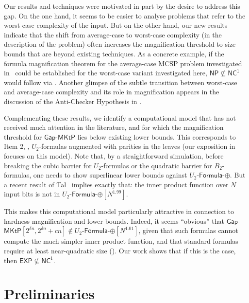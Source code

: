 \documentclass{toc}
\newcommand{\gapmktp}{\mathsf{Gap}$-$\mathsf{MKtP}}
\begin{document}
Our results and techniques were motivated in part by the desire to address this gap. On the one hand, it seems to be easier to analyse problems that refer to the worst-case complexity of the input. But on the other hand, our new results indicate that the shift from average-case to worst-case complexity (in the description of the problem) often increases the magnification threshold to size bounds that are beyond existing techniques. As a concrete example, if the formula magnification theorem for the average-case MCSP problem investigated in~\cite{OS18} could be established for the worst-case variant investigated here, $\mathsf{NP \nsubseteq \mathsf{NC}^1}$ would follow via . Another glimpse of the subtle transition between worst-case and average-case complexity and its role in magnification appears in the discussion of the Anti-Checker Hypothesis in .

Complementing these results, we identify a computational model that has not received much attention in the literature, and for which the magnification threshold for $\gapmktp$ lies below existing lower bounds. This corresponds to  Item 2, \ie, $U_2$-formulas augmented with parities in the leaves (our exposition in  focuses on this model). Note that, by a straightforward simulation, before breaking the cubic barrier for $U_2$-formulas or the quadratic barrier for $B_2$-formulas, one needs to show superlinear lower bounds against $U_2$-$\mathsf{Formula}$-$\oplus$. But a recent result of Tal~\cite{DBLP:journals/eccc/Tal16b} implies exactly that: the inner product function over $N$ input bits is not in $U_2$-$\mathsf{Formula}$-$\oplus[N^{1.99}]$.

This makes this computational model particularly attractive in connection to hardness magnification and lower bounds. Indeed, it seems ``obvious'' that $\gapmktp[2^{\delta n}, 2^{\delta n} + cn] \notin U_2$-$\mathsf{Formula}$-$\oplus[N^{1.01}]$, given that such formulas cannot compute the much simpler inner product function, and that standard formulas require at least near-quadratic size (). Our work shows that if this is the case, then $\mathsf{EXP} \nsubseteq \mathsf{NC}^1$. 


\section{Preliminaries}\label{s:preliminaries}
\end{document}
